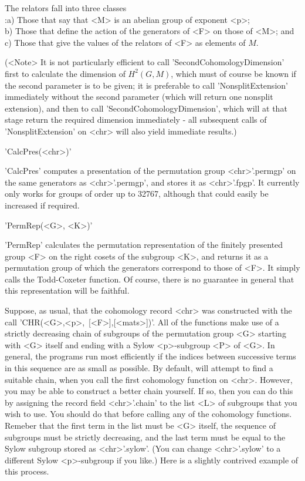 The relators fall into three classes\:\\
:a) Those that say that <M> is an abelian group of exponent <p>;\\
b) Those that define the action of the generators of <F> on
those of <M>; and\\
c) Those that give the values of the relators of <F> as elements of $M$.

(<Note>\: It is not particularly efficient to call 'SecondCohomologyDimension'
first to calculate the dimension of $H^2(G,M)$, which must of course be known
if the second parameter is to be given; it is preferable to call
'NonsplitExtension' immediately without the second parameter (which will
return one nonsplit extension), and then to call 'SecondCohomologyDimension',
which will at that stage return the required dimension immediately -
all subsequent calls of 'NonsplitExtension' on <chr> will also yield
immediate results.)

'CalcPres(<chr>)'

'CalcPres'  computes a presentation of the permutation group <chr>'.permgp'
on the same generators as <chr>'.permgp', and stores it as <chr>'.fpgp'.
It currently only works for groups of order up to 32767, although that
could easily be increased if required.

'PermRep(<G>, <K>)'

'PermRep' calculates the permutation representation of the finitely
presented group <F> on the right cosets of the subgroup <K>, and returns
it as a permutation group of which the generators correspond to those
of <F>. It simply calls the {\GAP} Todd-Coxeter function. Of course,
there is no guarantee in general that this representation will be
faithful.


Suppose, as usual, that the cohomology record <chr> was constructed
with the call 'CHR(<G>,<p>,\ [<F>],[<mats>])'.
All of the functions make use of a strictly decreasing chain of subgroups
of the permutation group <G> starting with <G> itself and ending with a
Sylow <p>-subgroup <P> of <G>. In general, the programs run most efficiently
if the indices between successive terms in this sequence are as small as
possible. By default, {\GAP} will attempt to find a suitable chain, when
you call the first cohomology function on <chr>. However, you may be able
to construct a better chain yourself. If so, then you can do this
by assigning the record field <chr>'.chain' to the list <L> of subgroups
that you wish to use. You should do that before calling any of the
cohomology functions. Remeber that the first term in the list must be
<G> itself, the sequence of subgroups must be strictly decreasing,
and the last term must be equal to the Sylow subgroup stored as
<chr>'.sylow'. (You can change <chr>'.sylow' to a different Sylow
<p>-subgroup if you like.) Here is a slightly contrived example of this
process.

